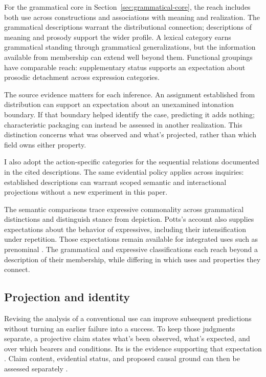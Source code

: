 \documentclass[12pt]{article}
\begin{document}
For the grammatical core in Section~\ref{sec:grammatical-core}, the reach
includes both use across constructions and associations with meaning
and realization. The grammatical descriptions warrant the distributional
connection; descriptions of meaning and prosody support the wider profile.
A lexical category earns grammatical standing through grammatical generalizations,
but the information available from membership can extend well beyond them.
Functional groupings have comparable reach: supplementary status supports
an expectation about prosodic detachment across expression categories.

The source evidence matters for each inference. An assignment established
from distribution can support an expectation about an unexamined intonation
boundary. If that boundary helped identify the case, predicting it
adds nothing; characteristic packaging can instead be assessed in another
realization. This distinction concerns what was observed and what's
projected, rather than which field owns either property.

I also adopt the action-specific categories for the sequential relations
documented in the cited descriptions. The same evidential policy applies
across inquiries: established descriptions can warrant scoped semantic and
interactional projections without a new experiment in this paper.

The semantic comparisons trace expressive commonality across grammatical
distinctions and distinguish stance from depiction. Potts's account also
supplies expectations about the behavior of expressives, including their
intensification under repetition. Those expectations remain available for
integrated uses such as prenominal . The grammatical
and expressive classifications each reach beyond a description of their
membership, while differing in which uses and properties they connect.

\subsection{Projection and identity}

Revising the analysis of a conventional use can improve subsequent
predictions without turning an earlier failure into a success. To
keep those judgments separate, a projective claim states what's been
observed, what's expected, and over which bearers and conditions.
Its  is the evidence supporting that expectation
\citep{Goodman1955}. Claim content, evidential status, and proposed causal
ground can then be assessed separately
\citep[11--12]{reynolds2026projectibilityHistory}.
\end{document}
